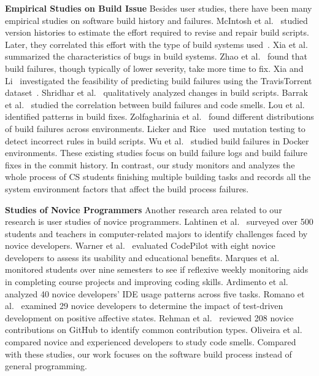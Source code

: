 \textbf{Empirical Studies on Build Issue}
Besides user studies, there have been many empirical studies on software build history and failures. McIntosh et al.~\cite{mcintosh2011empirical} studied version histories to estimate the effort required to revise and repair build scripts. Later, they correlated this effort with the type of build systems used~\cite{mcintosh2015large}. Xia et al.~\cite{xia2014empirical} summarized the characteristics of bugs in build systems. Zhao et al.~\cite{zhao2014empirical} found that build failures, though typically of lower severity, take more time to fix. Xia and Li~\cite{xia2014empirical} investigated the feasibility of predicting build failures using the TravisTorrent dataset~\cite{beller2017travistorrent}. Shridhar et al.~\cite{shridhar2014qualitative} qualitatively analyzed changes in build scripts. Barrak et al.~\cite{barrak2021builds} studied the correlation between build failures and code smells. Lou et al.~\cite{lou2020understanding} identified patterns in build fixes. Zolfagharinia et al.~\cite{zolfagharinia2017not} found different distributions of build failures across environments. Licker and Rice~\cite{licker2019detecting} used mutation testing to detect incorrect rules in build scripts. Wu et al.~\cite{wu2020empirical} studied build failures in Docker environments. 
These existing studies focus on build failure logs and build failure fixes in the commit history. In contrast, our study monitors and analyzes the whole process of CS students finishing multiple building tasks and records all the system environment factors that affect the build process failures.

\textbf{Studies of Novice Programmers}
Another research area related to our research is user studies of novice programmers. 
Lahtinen et al.~\cite{lahtinen2005study} surveyed over 500 students and teachers in computer-related majors to identify challenges faced by novice developers. Warner et al.~\cite{warner2017codepilot} evaluated CodePilot with eight novice developers to assess its usability and educational benefits. Marques et al.~\cite{marques2017enhancing} monitored students over nine semesters to see if reflexive weekly monitoring aids in completing course projects and improving coding skills. Ardimento et al.~\cite{ardimento2019evaluating} analyzed 40 novice developers' IDE usage patterns across five tasks. Romano et al.~\cite{romano2019empirical} examined 29 novice developers to determine the impact of test-driven development on positive affective states. Rehman et al.~\cite{rehman2020newcomer} reviewed 208 novice contributions on GitHub to identify common contribution types. Oliveira et al.~\cite{oliveira2020collaborative} compared novice and experienced developers to study code smells.
Compared with these studies, our work focuses on the software build process instead of general programming. 

